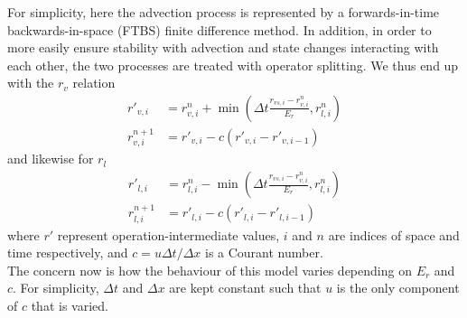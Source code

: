 \documentclass[11pt]{article}
\begin{document}
For simplicity, here the advection process is represented by a forwards-in-time backwards-in-space (FTBS) finite difference method. In addition, in order to more easily ensure stability with advection and state changes interacting with each other, the two processes are treated with operator splitting. We thus end up with the $r_v$ relation
\begin{align} \label{eq:4}
r'_{v,i} &= r^n_{v,i} + \min\left(\Delta t\frac{r_{vs,i} - r^n_{v,i}}{E_r},r^n_{l,i}\right) \\ \label{eq:5}
r^{n+1}_{v,i} &= r'_{v,i} - c\left(r'_{v,i} - r'_{v,i-1}\right)
\end{align}
and likewise for $r_l$
\begin{align} \label{eq:6}
r'_{l,i} &= r^n_{l,i} - \min\left(\Delta t\frac{r_{vs,i} - r^n_{v,i}}{E_r},r^n_{l,i}\right) \\ \label{eq:7}
r^{n+1}_{l,i} &= r'_{l,i} - c\left(r'_{l,i} - r'_{l,i-1}\right)
\end{align}
where $r'$ represent operation-intermediate values, $i$ and $n$ are indices of space and time respectively, and $c=u \Delta t/\Delta x$ is a Courant number. \\
The concern now is how the behaviour of this model varies depending on $E_r$ and $c$. For simplicity, $\Delta t$ and $\Delta x$ are kept constant such that $u$ is the only component of $c$ that is varied.
\end{document}
